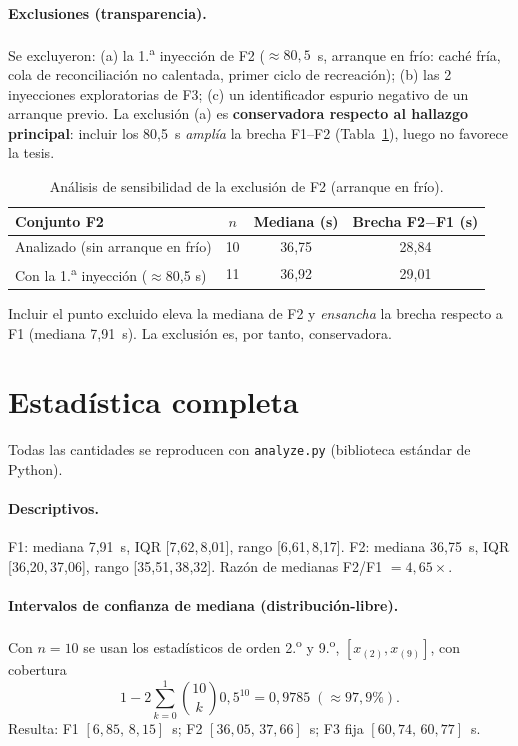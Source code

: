 \documentclass[11pt,letterpaper]{article}
\begin{document}
\paragraph{Exclusiones (transparencia).} Se excluyeron: (a) la 1.\textsuperscript{a} inyección de F2 ($\approx 80{,}5$~s, arranque en frío: caché fría, cola de reconciliación no calentada, primer ciclo de recreación); (b) las 2 inyecciones exploratorias de F3; (c) un identificador espurio negativo de un arranque previo. La exclusión (a) es \textbf{conservadora respecto al hallazgo principal}: incluir los 80{,}5~s \emph{amplía} la brecha F1--F2 (Tabla~\ref{tab:sens}), luego no favorece la tesis.

\begin{table}[t]
\centering
\caption{Análisis de sensibilidad de la exclusión de F2 (arranque en frío).}
\label{tab:sens}
\begin{tabular}{lccc}
\toprule
Conjunto F2 & $n$ & Mediana (s) & Brecha F2$-$F1 (s) \\
\midrule
Analizado (sin arranque en frío) & 10 & 36{,}75 & 28{,}84 \\
Con la 1.\textsuperscript{a} inyección ($\approx$80{,}5 s) & 11 & 36{,}92 & 29{,}01 \\
\bottomrule
\end{tabular}

\smallskip
\footnotesize Incluir el punto excluido eleva la mediana de F2 y \emph{ensancha} la brecha respecto a F1 (mediana 7{,}91~s). La exclusión es, por tanto, conservadora.
\end{table}

\section{Estadística completa}
Todas las cantidades se reproducen con \texttt{analyze.py} (biblioteca estándar de Python).

\paragraph{Descriptivos.} F1: mediana 7{,}91~s, IQR [7{,}62,\,8{,}01], \allowbreak rango [6{,}61,\,8{,}17]. \allowbreak F2: mediana 36{,}75~s, \allowbreak IQR [36{,}20,\,37{,}06], \allowbreak rango [35{,}51,\,38{,}32]. Razón de medianas F2/F1 $= 4{,}65\times$.

\paragraph{Intervalos de confianza de mediana (distribución-libre).} Con $n=10$ se usan los estadísticos de orden 2.\textsuperscript{o} y 9.\textsuperscript{o}, $[x_{(2)},x_{(9)}]$, con cobertura
\begin{equation*}
1-2\sum_{k=0}^{1}\binom{10}{k}0{,}5^{10}=0{,}9785\;(\approx 97{,}9\%).
\end{equation*}
Resulta: F1 $[6{,}85,\,8{,}15]$~s; F2 $[36{,}05,\,37{,}66]$~s; F3 fija $[60{,}74,\,60{,}77]$~s.
\end{document}
